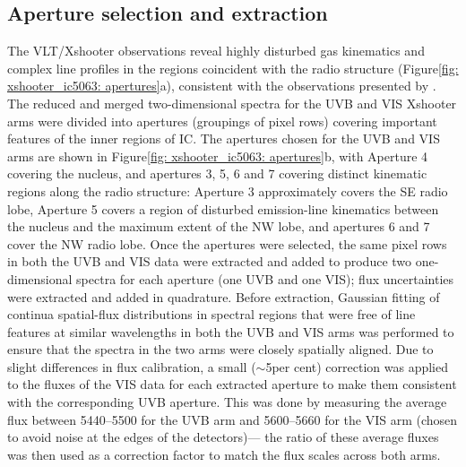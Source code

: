 \subsection{Aperture selection and extraction}
\label{section: xshooter_ic_5063: observations_and_data_reduction: apertures}

The VLT/Xshooter observations reveal highly disturbed gas kinematics and complex line profiles in the regions coincident with the radio structure (Figure\;\ref{fig: xshooter_ic5063: apertures}a), consistent with the observations presented by \citet{Morganti2007}. The reduced and merged two-dimensional spectra for the UVB and VIS Xshooter arms were divided into apertures (groupings of pixel rows) covering important features of the inner regions of IC. The apertures chosen for the UVB and VIS arms are shown in Figure\;\ref{fig: xshooter_ic5063: apertures}b, with Aperture 4 covering the nucleus, and apertures 3, 5, 6 and 7 covering distinct kinematic regions along the radio structure: Aperture 3 approximately covers the SE radio lobe, Aperture 5 covers a region of disturbed emission-line kinematics between the nucleus and the maximum extent of the NW lobe, and apertures 6 and 7 cover the NW radio lobe. Once the apertures were selected, the same pixel rows in both the UVB and VIS data were extracted and added to produce two one-dimensional spectra for each aperture (one UVB and one VIS); flux uncertainties were extracted and added in quadrature. Before extraction, Gaussian fitting of continua spatial-flux distributions in spectral regions that were free of line features at similar wavelengths in both the UVB and VIS arms was performed to ensure that the spectra in the two arms were closely spatially aligned. Due to slight differences in flux calibration, a small ($\sim$5\;per cent) correction was applied to the fluxes of the VIS data for each extracted aperture to make them consistent with the corresponding UVB aperture. This was done by measuring the average flux between 5440--5500\;{\AA} for the UVB arm and 5600--5660\;{\AA} for the VIS arm (chosen to avoid noise at the edges of the detectors)--- the ratio of these average fluxes was then used as a correction factor to match the flux scales across both arms. 

